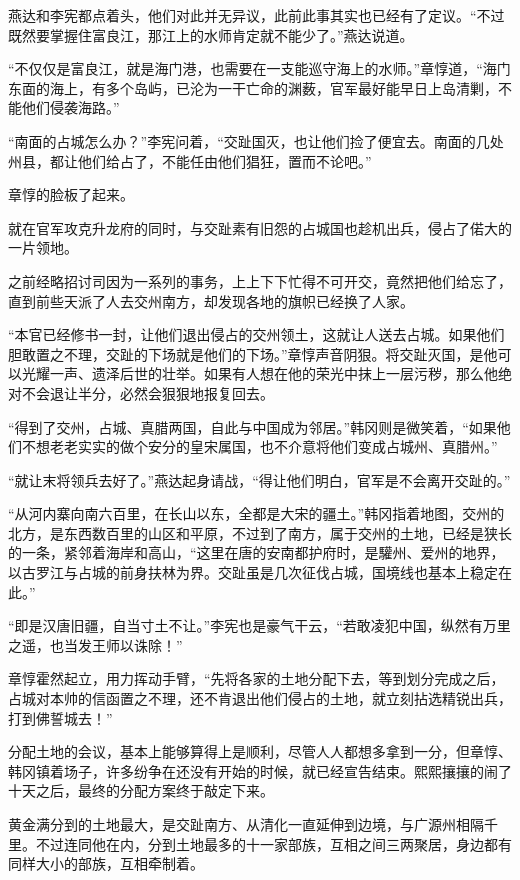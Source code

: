燕达和李宪都点着头，他们对此并无异议，此前此事其实也已经有了定议。“不过既然要掌握住富良江，那江上的水师肯定就不能少了。”燕达说道。

“不仅仅是富良江，就是海门港，也需要在一支能巡守海上的水师。”章惇道，“海门东面的海上，有多个岛屿，已沦为一干亡命的渊薮，官军最好能早日上岛清剿，不能他们侵袭海路。”

“南面的占城怎么办？”李宪问着，“交趾国灭，也让他们捡了便宜去。南面的几处州县，都让他们给占了，不能任由他们猖狂，置而不论吧。”

章惇的脸板了起来。

就在官军攻克升龙府的同时，与交趾素有旧怨的占城国也趁机出兵，侵占了偌大的一片领地。

之前经略招讨司因为一系列的事务，上上下下忙得不可开交，竟然把他们给忘了，直到前些天派了人去交州南方，却发现各地的旗帜已经换了人家。

“本官已经修书一封，让他们退出侵占的交州领土，这就让人送去占城。如果他们胆敢置之不理，交趾的下场就是他们的下场。”章惇声音阴狠。将交趾灭国，是他可以光耀一声、遗泽后世的壮举。如果有人想在他的荣光中抹上一层污秽，那么他绝对不会退让半分，必然会狠狠地报复回去。

“得到了交州，占城、真腊两国，自此与中国成为邻居。”韩冈则是微笑着，“如果他们不想老老实实的做个安分的皇宋属国，也不介意将他们变成占城州、真腊州。”

“就让末将领兵去好了。”燕达起身请战，“得让他们明白，官军是不会离开交趾的。”

“从河内寨向南六百里，在长山以东，全都是大宋的疆土。”韩冈指着地图，交州的北方，是东西数百里的山区和平原，不过到了南方，属于交州的土地，已经是狭长的一条，紧邻着海岸和高山，“这里在唐的安南都护府时，是驩州、爱州的地界，以古罗江与占城的前身扶林为界。交趾虽是几次征伐占城，国境线也基本上稳定在此。”

“即是汉唐旧疆，自当寸土不让。”李宪也是豪气干云，“若敢凌犯中国，纵然有万里之遥，也当发王师以诛除！”

章惇霍然起立，用力挥动手臂，“先将各家的土地分配下去，等到划分完成之后，占城对本帅的信函置之不理，还不肯退出他们侵占的土地，就立刻拈选精锐出兵，打到佛誓城去！”

分配土地的会议，基本上能够算得上是顺利，尽管人人都想多拿到一分，但章惇、韩冈镇着场子，许多纷争在还没有开始的时候，就已经宣告结束。熙熙攘攘的闹了十天之后，最终的分配方案终于敲定下来。

黄金满分到的土地最大，是交趾南方、从清化一直延伸到边境，与广源州相隔千里。不过连同他在内，分到土地最多的十一家部族，互相之间三两聚居，身边都有同样大小的部族，互相牵制着。

